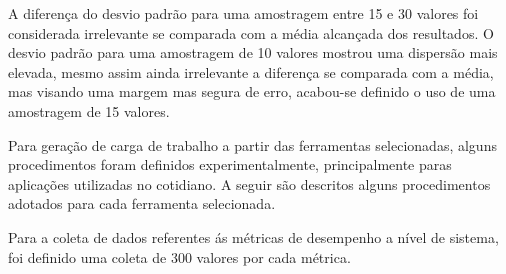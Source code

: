 A diferença do desvio padrão para uma amostragem entre 15 e 30 valores foi considerada irrelevante se comparada com a média alcançada dos resultados. O desvio padrão para uma amostragem de 10 valores mostrou uma dispersão mais elevada, mesmo assim ainda irrelevante a diferença se comparada com a média, mas visando uma margem mas segura de erro, acabou-se definido o uso de uma amostragem de 15 valores. 

Para geração de carga de trabalho a partir das ferramentas selecionadas, alguns procedimentos foram definidos experimentalmente, principalmente paras aplicações utilizadas no cotidiano. A seguir são descritos alguns procedimentos adotados para cada ferramenta selecionada.

Para a coleta de dados referentes ás métricas de desempenho a nível de sistema, foi definido uma coleta de 300 valores por cada métrica. 

